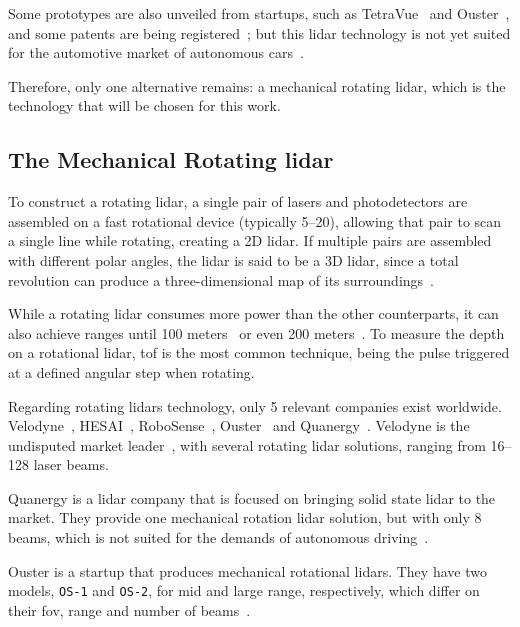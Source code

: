 Some prototypes are also unveiled from startups, such as TetraVue~\cite{TetraVue} and Ouster~\cite{Ouster}, and some patents are being registered~\cite{Simpson2019}; but this \ac{lidar} technology is not yet suited for the automotive market of autonomous cars~\cite{Fersch2017a}.

Therefore, only one alternative remains: a mechanical rotating \ac{lidar}, which is the technology that will be chosen for this work.

\subsection{The Mechanical Rotating \acs{lidar}}
To construct a rotating \ac{lidar}, a single pair of \acp{laser} and photodetectors are assembled on a fast rotational device (typically \SIrange{5}{20}{\revspersecond}), allowing that pair to scan a single line while rotating, creating a 2D \ac{lidar}. If multiple pairs are assembled with different polar angles, the \ac{lidar} is said to be a 3D \ac{lidar}, since a total revolution can produce a three-dimensional map of its surroundings~\cite{Sullivan2016}.

While a rotating \ac{lidar} consumes more power than the other counterparts, it can also achieve ranges until 100 meters~\cite{VLP16, Sullivan2016} or even 200 meters~\cite{VelodyneHDL64, Pandar40UserGuide, Sullivan2016}. To measure the depth on a rotational \ac{lidar}, \ac{tof} is the most common technique, being the pulse triggered at a defined angular step when rotating.

Regarding rotating \acp{lidar} technology, only 5 relevant companies exist worldwide. Velodyne\cp~\cite{Velodyne}, HESAI\cp~\cite{Hesai}, RoboSense\cp~\cite{Robosense}, Ouster\cp~\cite{Ouster} and Quanergy\cp~\cite{Quanergy}. Velodyne is the undisputed market leader~\cite{Sullivan2016, Hecht2018}, with several rotating \ac{lidar} solutions, ranging from \SIrange{16}{128}{} \ac{laser} beams.

Quanergy is a \ac{lidar} company that is focused on bringing solid state \ac{lidar} to the market. They provide one mechanical rotation \ac{lidar} solution, but with only 8 beams, which is not suited for the demands of autonomous driving~\cite{Sullivan2016, Hecht2018}. 

Ouster is a startup that produces mechanical rotational \acp{lidar}. They have two models, \texttt{OS-1} and \texttt{OS-2}, for mid and large range, respectively, which differ on their \ac{fov}, range and number of beams~\cite{Ouster}.

